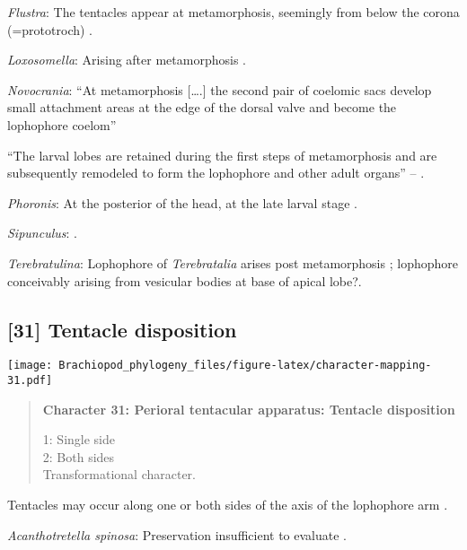 \documentclass[openany]{book}
\theoremstyle{definition}
\theoremstyle{definition}
\theoremstyle{definition}
\theoremstyle{remark}
\begin{document}
\hypertarget{Flustra-coding-30}{}
\emph{Flustra}: The tentacles appear at metamorphosis, seemingly from
below the corona (=prototroch) \citep{Young2002}.

\hypertarget{Loxosomella-coding-30}{}
\emph{Loxosomella}: Arising after metamorphosis \citep{Nielsen1971}.

\hypertarget{Novocrania-coding-30}{}
\emph{Novocrania}: ``At metamorphosis {[}\ldots{}.{]} the second pair of
coelomic sacs develop small attachment areas at the edge of the dorsal
valve and become the lophophore coelom'' \citep{Nielsen1991}

``The larval lobes are retained during the first steps of metamorphosis
and are\\
subsequently remodeled to form the lophophore and other adult organs''
-- \citet{Altenburger2013}.

\hypertarget{Phoronis-coding-30}{}
\emph{Phoronis}: At the posterior of the head, at the late larval stage
\citep{Santagata2004}.

\hypertarget{Sipunculus-coding-30}{}
\emph{Sipunculus}: \citep{Adrianov2006}.

\hypertarget{Terebratulina-coding-30}{}
\emph{Terebratulina}: Lophophore of \emph{Terebratalia} arises post
metamorphosis \citep{Young2002}; lophophore conceivably arising from
vesicular bodies at base of apical lobe?.

\subsection*{{[}31{]} Tentacle disposition}\label{tentacle-disposition}

\texttt{[image: Brachiopod\_phylogeny\_files/figure-latex/character-mapping-31.pdf]}

\begin{quote}
\textbf{Character 31: Perioral tentacular apparatus: Tentacle
disposition}

1: Single side\\
2: Both sides\\
Transformational character.
\end{quote}

Tentacles may occur along one or both sides of the axis of the
lophophore arm \citep{Carlson1995Phylogeneticrelationships}.

\hypertarget{Acanthotretella_spinosa-coding-31}{}
\emph{Acanthotretella spinosa}: Preservation insufficient to evaluate
\citep{Holmer2006Aspinose}.
\end{document}
